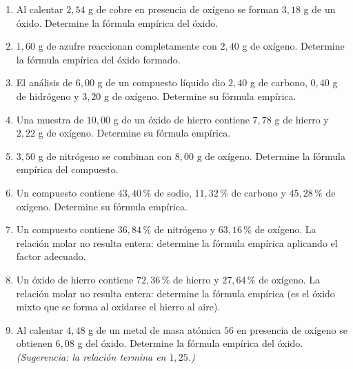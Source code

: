 \documentclass[12pt, letterpaper]{article}
\newcommand{\pc}{\text{\%}}
\begin{document}
\begin{enumerate}[leftmargin=*, start=30]
  \item \dificil{}\hspace{0.55em}Al calentar $2{,}54$ g de cobre en presencia de oxígeno se forman $3{,}18$ g de un óxido. Determine la fórmula empírica del óxido.

  \item \dificil{}\hspace{0.55em}$1{,}60$ g de azufre reaccionan completamente con $2{,}40$ g de oxígeno. Determine la fórmula empírica del óxido formado.

  \item \dificil{}\hspace{0.55em}El análisis de $6{,}00$ g de un compuesto líquido dio $2{,}40$ g de carbono, $0{,}40$ g de hidrógeno y $3{,}20$ g de oxígeno. Determine su fórmula empírica.

  \item \dificil{}\hspace{0.55em}Una muestra de $10{,}00$ g de un óxido de hierro contiene $7{,}78$ g de hierro y $2{,}22$ g de oxígeno. Determine su fórmula empírica.

  \item \dificil{}\hspace{0.55em}$3{,}50$ g de nitrógeno se combinan con $8{,}00$ g de oxígeno. Determine la fórmula empírica del compuesto.

  \item \dificil{}\hspace{0.55em}Un compuesto contiene $43{,}40\,\pc$ de sodio, $11{,}32\,\pc$ de carbono y $45{,}28\,\pc$ de oxígeno. Determine su fórmula empírica.

  \item \muyDificil{}\hspace{0.55em}Un compuesto contiene $36{,}84\,\pc$ de nitrógeno y $63{,}16\,\pc$ de oxígeno. La relación molar no resulta entera: determine la fórmula empírica aplicando el factor adecuado.

  \item \muyDificil{}\hspace{0.55em}Un óxido de hierro contiene $72{,}36\,\pc$ de hierro y $27{,}64\,\pc$ de oxígeno. La relación molar no resulta entera: determine la fórmula empírica (es el óxido mixto que se forma al oxidarse el hierro al aire).

  \item \muyDificil{}\hspace{0.55em}Al calentar $4{,}48$ g de un metal de masa atómica $56$ en presencia de oxígeno se obtienen $6{,}08$ g del óxido. Determine la fórmula empírica del óxido. \emph{(Sugerencia: la relación termina en $1{,}25$.)}

\end{enumerate}
\end{document}
